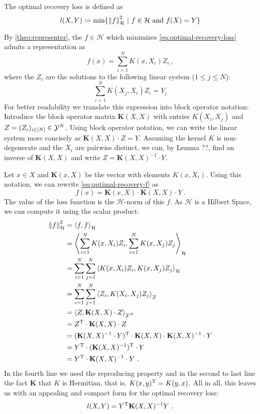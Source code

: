 The optimal recovery loss is defined as
\begin{equation}
	\label{eq:optimal-recovery-loss}
	l(X, Y) \coloneqq \min\{\norm{f}_\mathcal{H}^2 ~|~ f\in \mathcal{H} \text{~and~} f(X) = Y\}
\end{equation}

By \cref{theo:representer}, the $f \in \mathcal{H}$ which minimizes \cref{eq:optimal-recovery-loss} admits a representation as 
\begin{equation}
	\label{eq:optimal-recovery-f}
	f(x) = \sum_{i=1}^N K(x, X_i) Z_i \ ,
\end{equation}
where the $Z_i$ are the solutions to the following linear system ($1 \leq j \leq N$):
\begin{equation}
	\sum_{i=1}^{N} K(X_j, X_i) Z_i = Y_j
\end{equation}
For better readability we translate this expression into block operator notation:
Introduce the block operator matrix $\mathbf{K}(X, X)$ with entries $K(X_i, X_j)$ and $Z = (Z_i)_{i \in [N]} \in \mathcal{Y}^N$.
Using block operator notation, we can write the linear system more concisely as $\mathbf{K}(X, X) \cdot Z = Y$.
Assuming the kernel $K$ is non-degenerate and the $X_i$ are pairwise distinct, we can, by Lemma ??, find an inverse of $\mathbf{K}(X, X)$ and write $Z = \mathbf{K}(X, X)^{-1} \cdot Y$.

Let $x \in X$ and $\mathbf{K}(x, X)$ be the vector with elements $K(x, X_i)$.
Using this notation, we can rewrite \cref{eq:optimal-recovery-f} as
\begin{equation}
	f(x) = \mathbf{K}(x, X) \cdot \mathbf{K}(X, X) \cdot Y \ .
\end{equation}
The value of the loss function is the $\mathcal{H}$-norm of this $f$.
As $\mathcal{H}$ is a Hilbert Space, we can compute it using the scalar product:
\begin{align}
	\norm{f}_\mathcal{H}^2 &= \left< f, f\right>_\mathcal{H}\\
	&= \left< \sum_{i=1}^N K(x, X_i) Z_i, \sum_{i=1}^N K(x, X_j) Z_j \right>_\mathcal{H}\\
	&= \sum_{i=1}^N \sum_{j=1}^N \left< K(x, X_i) Z_i, K(x, X_j) Z_j \right>_\mathcal{H}\\
	&= \sum_{i=1}^N \sum_{j=1}^N \left< Z_i, K(X_i, X_j) Z_j \right>_{\mathcal{Y}}\\
	&= \left< Z, \mathbf{K}(X, X) \cdot Z\right >_{\mathcal{Y}^N}\\
	&= Z^{\mathrm{T}} \cdot \mathbf{K}(X, X) \cdot Z \\
	&= (\mathbf{K}(X, X)^{-1} \cdot Y)^{\mathrm{T}} \cdot \mathbf{K}(X, X) \cdot \mathbf{K}(X, X)^{-1} \cdot Y\\
	&= Y^{\mathrm{T}} \cdot (\mathbf{K}(X, X)^{-1})^{\mathrm{T}} \cdot Y\\
	&=  Y^{\mathrm{T}} \cdot \mathbf{K}(X, X)^{-1} \cdot Y \ .
\end{align}
In the fourth line we used the reproducing property and in the second to last line the fact $\mathbf{K}$ that $K$ is Hermitian, that is, $K(x, y)^{\mathrm{T}} = K(y, x)$.
All in all, this leaves us with an appealing and compact form for the optimal recovery loss:
\begin{equation}
	\label{eq:optimal-recovery-loss-closed-form}
	l(X, Y) = Y^{\mathrm{T}} \mathbf{K}(X, X)^{-1} Y \ .
\end{equation}
